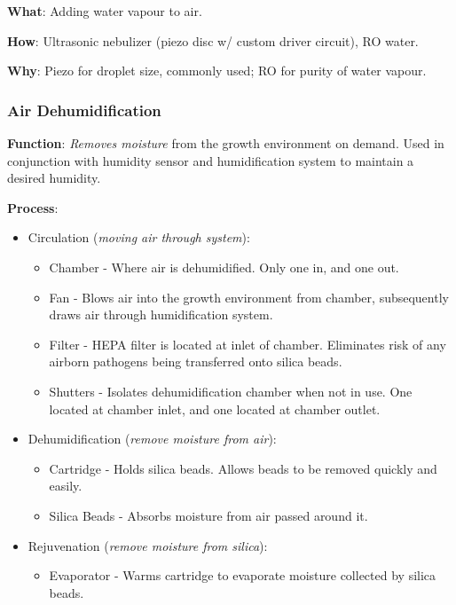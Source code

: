 \documentclass{report}
\begin{document}
\textbf{What}: Adding water vapour to air.

\textbf{How}: Ultrasonic nebulizer (piezo disc w/ custom driver circuit), RO water.

\textbf{Why}: Piezo for droplet size, commonly used; RO for purity of water vapour.

\subsubsection{Air Dehumidification}
\label{sec:dehum}

\textbf{Function}: \textit{Removes moisture} from the growth environment on demand. Used in conjunction with humidity sensor and humidification system to maintain a desired humidity.

\textbf{Process}:
\begin{itemize}
    \item Circulation (\textit{moving air through system}):
    \begin{itemize}
        \item Chamber - Where air is dehumidified. Only one in, and one out.
        \item Fan - Blows air into the growth environment from chamber, subsequently draws air through humidification system.
        \item Filter - HEPA filter is located at inlet of chamber. Eliminates risk of any airborn pathogens being transferred onto silica beads.
        \item Shutters - Isolates dehumidification chamber when not in use. One located at chamber inlet, and one located at chamber outlet. 
    \end{itemize}
    \item Dehumidification (\textit{remove moisture from air}):
    \begin{itemize}
        \item Cartridge - Holds silica beads. Allows beads to be removed quickly and easily.
        \item Silica Beads - Absorbs moisture from air passed around it.
    \end{itemize}
    \item Rejuvenation (\textit{remove moisture from silica}):
    \begin{itemize}
        \item Evaporator - Warms cartridge to evaporate moisture collected by silica beads.
    \end{itemize}
\end{itemize}
\end{document}
